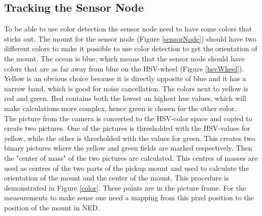 \subsection{Tracking the Sensor Node}
\label{node}
To be able to use color detection the sensor node need to have some colors that sticks out. The mount for the sensor node (Figure \ref{sensorNode}) should have two different colors to make it possible to use color detection to get the orientation of the mount. The ocean is blue, which means that the sensor node should have colors that are as far away from blue on the HSV-wheel (Figure \ref{hsvWheel}). Yellow is an obvious choice because it is directly opposite of blue and it has a narrow band, which is good for noise cancellation. The colors next to yellow is red and green. Red contains both the lowest an highest hue values, which will make calculations more complex, hence green is chosen for the other color.\\
\newline
The picture from the camera is converted to the HSV-color space and copied to create two pictures. One of the pictures is thresholded with the HSV-values for yellow, while the other is thresholded with the values for green. This creates two binary pictures where the yellow and green fields are marked respectively. Then the "center of mass" of the two pictures are calculated. This centres of masses are used as centres of the two parts of the pickup mount and used to calculate the orientation of the mount and the center of the mount. This procedure is demonstrated in Figure \ref{color}. These points are in the picture frame. For the measurements to make sense one need a mapping from this pixel position to the position of the mount in NED.\\

